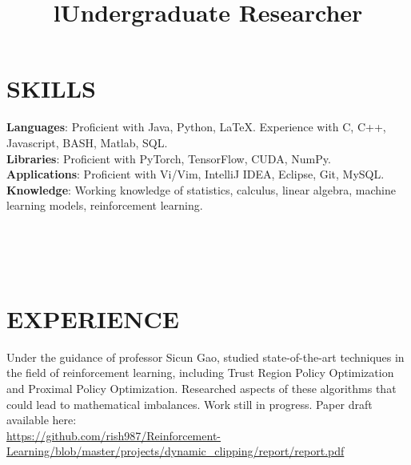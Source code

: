 \documentclass[margin]{res}
\begin{document}
\begin{resume}


\section{SKILLS}

\textbf{Languages}: 
Proficient with Java, Python, \LaTeX.
Experience with C, C++, Javascript, BASH, Matlab, SQL.
\\
\textbf{Libraries}: 
Proficient with PyTorch, TensorFlow, CUDA, NumPy.
\\
\textbf{Applications}: Proficient with Vi/Vim, IntelliJ IDEA, Eclipse, Git,
MySQL.  
\\
\textbf{Knowledge}: Working knowledge of statistics, calculus, linear algebra,
machine learning models, reinforcement learning.

\begin{format}
\title{l}\\
\\
\body\\
\end{format}

\section{EXPERIENCE}
\title{\textbf{Undergraduate Researcher}}
\begin{position}
Under the guidance of professor Sicun Gao, studied state-of-the-art techniques
in the field of reinforcement learning, including Trust Region Policy
Optimization and Proximal Policy Optimization.  Researched aspects of these
algorithms that could lead to mathematical imbalances. Work still in progress.
Paper draft available here:\\
    \url{https://github.com/rish987/Reinforcement-Learning/blob/master/projects/dynamic_clipping/report/report.pdf}
\end{position}


\end{resume}
\end{document}

